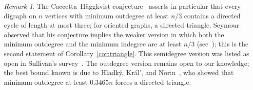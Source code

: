 \documentclass[11pt]{amsart}
\theoremstyle{remark}
\newtheorem{remark}[theorem]{Remark}
\begin{document}
\begin{remark}\label{rem:ch}
The Caccetta--H\"aggkvist conjecture~\cite{CH} asserts in particular that every digraph on $n$ vertices with minimum outdegree at least $n/3$ contains a directed cycle of length at most three; for oriented graphs, a directed triangle. Seymour observed that his conjecture implies the weaker version in which both the minimum outdegree and the minimum indegree are at least $n/3$ (see~\cite{CSY,Sullivan}); this is the second statement of Corollary~\ref{cor:triangle}. This semidegree version was listed as open in Sullivan's survey~\cite{Sullivan}. The outdegree version remains open to our knowledge; the best bound known is due to Hladk\'y, Kr\'al', and Norin~\cite{HKN}, who showed that minimum outdegree at least $0.3465n$ forces a directed triangle.
\end{remark}
\end{document}
